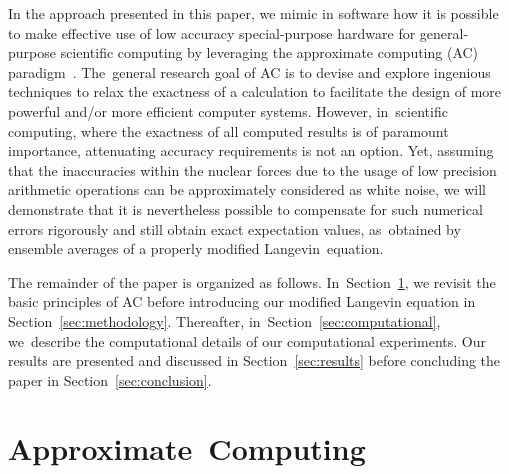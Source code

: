 \documentclass[computation,article,accept,moreauthors,pdftex]{Definitions/mdpi}
\begin{document}
In the approach presented in this paper, we {mimic in software how it is possible to} make effective use of low accuracy special-purpose hardware for general-purpose scientific computing by leveraging the approximate computing (AC) paradigm~\cite{KlavikMalossiBekasEtAl2014, PlesslAC}. The~general research goal of AC is to devise and explore ingenious techniques to relax the exactness of a calculation to facilitate the design of more powerful and/or more efficient computer systems. However, in~scientific computing, where the exactness of all computed results is of paramount importance, attenuating accuracy requirements is not an option. Yet, {assuming that the inaccuracies within the nuclear forces due to the usage of low precision arithmetic operations can be approximately considered as white noise}, we will demonstrate that it is nevertheless possible to compensate for such numerical errors rigorously and still obtain exact expectation values, as~obtained by ensemble averages of a properly modified Langevin~equation.

The remainder of the paper is organized as follows. In~Section~\ref{sec:ac}, we revisit the basic principles of AC before introducing our modified Langevin equation in Section~\ref{sec:methodology}. Thereafter, in~Section~\ref{sec:computational}, we~describe the computational details of our computational experiments. Our results are presented and discussed in Section~\ref{sec:results} before concluding the paper in Section~\ref{sec:conclusion}.


\section{Approximate~Computing}
\label{sec:ac}
\end{document}
